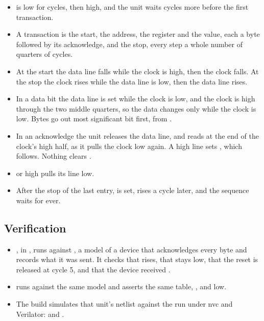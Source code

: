 \begin{itemize}
\item {} is low for  cycles, then high, and the
unit waits  cycles more before the first transaction.
\item A transaction is the start, the address, the register and the
value, each a byte followed by its acknowledge, and the stop, every
step a whole number of quarters of  cycles.
\item At the start the data line falls while the clock is high, then
the clock falls. At the stop the clock rises while the data line is
low, then the data line rises.
\item In a data bit the data line is set while the clock is low, and
the clock is high through the two middle quarters, so the data changes
only while the clock is low. Bytes go out most significant bit first,
from .
\item In an acknowledge the unit releases the data line, and reads
 at the end of the clock's high half, as it pulls the
clock low again. A high line sets , which 
follows. Nothing clears .
\item {} or  high pulls its line low.
\item After the stop of the last entry,  is set,
 rises a cycle later, and the sequence waits for ever.
\end{itemize}

\subsection*{Verification}

\begin{itemize}
\item {}, in
, runs  against
, a model of a device that acknowledges every byte and
records what it was sent. It checks that  rises, that
 stays low, that the reset is released at cycle 5, and
that the device received .
\item {} runs  against the same model
and asserts the same table, , and  low.
\item The build simulates that unit's netlist against the run under
nvc and Verilator: 
and .
\end{itemize}

